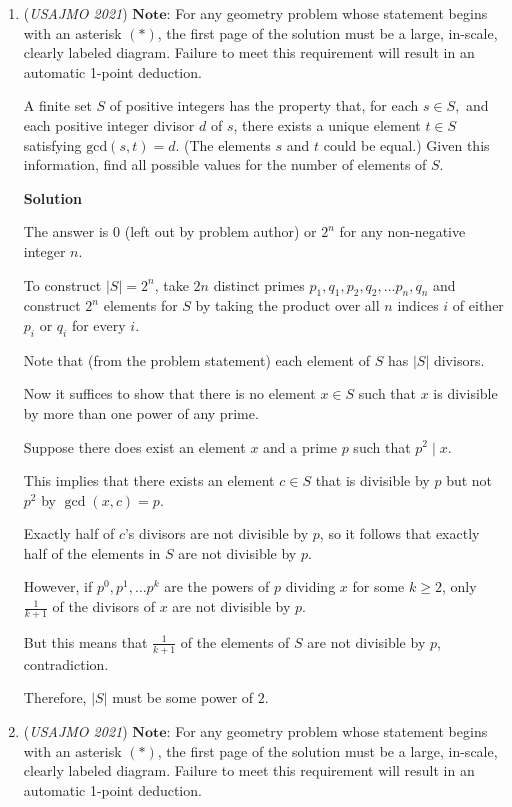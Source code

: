 \begin{enumerate}
 


	\item (\textit{USAJMO 2021}) $\textbf{Note:}$ For any geometry problem whose statement begins with an asterisk $(*)$, the first page of the solution must be a large, in-scale, clearly labeled diagram. Failure to meet this requirement will result in an automatic 1-point deduction.


 A finite set $S$ of positive integers has the property that, for each $s \in S,$ and each positive integer divisor $d$ of $s$, there exists a unique element $t \in S$ satisfying $\text{gcd}(s, t) = d$. (The elements $s$ and $t$ could be equal.) Given this information, find all possible values for the number of elements of $S$.


 



\textbf{Solution}

The answer is $0$ (left out by problem author) or $2^n$ for any non-negative integer $n$.

 To construct $|S|=2^n$, take $2n$ distinct primes $p_1, q_1, p_2, q_2, \dots p_n, q_n$ and construct $2^n$ elements for $S$ by taking the product over all $n$ indices $i$ of either $p_i$ or $q_i$ for every $i$.

 Note that (from the problem statement) each element of $S$ has $|S|$ divisors.

 Now it suffices to show that there is no element $x \in S$ such that $x$ is divisible by more than one power of any prime.

 Suppose there does exist an element $x$ and a prime $p$ such that $p^2 \mid x$.

 This implies that there exists an element $c \in S$ that is divisible by $p$ but not $p^2$ by $\gcd (x,c)=p$.

 Exactly half of $c$'s divisors are not divisible by $p$, so it follows that exactly half of the elements in $S$ are not divisible by $p$.

 However, if $p^0 , p^1 , \dots p^k$ are the powers of $p$ dividing $x$ for some $k \ge 2$, only $\frac{1}{k+1}$ of the divisors of $x$ are not divisible by $p$.

 But this means that $\frac{1}{k+1}$ of the elements of $S$ are not divisible by $p$, contradiction.

 Therefore, $|S|$ must be some power of $2$.

 


	\item (\textit{USAJMO 2021}) $\textbf{Note:}$ For any geometry problem whose statement begins with an asterisk $(*)$, the first page of the solution must be a large, in-scale, clearly labeled diagram. Failure to meet this requirement will result in an automatic 1-point deduction.



\end{enumerate}
